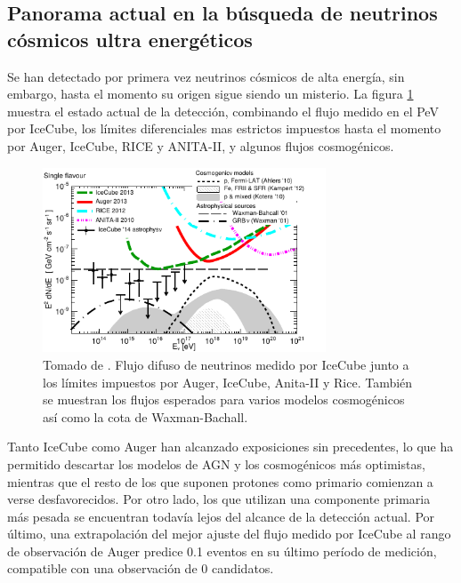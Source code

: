 	\subsection{Panorama actual en la b\'usqueda de neutrinos c\'osmicos ultra energ\'eticos}
	
	Se han detectado por primera vez neutrinos c\'osmicos de alta energ\'ia, sin embargo, hasta el momento su origen sigue siendo un misterio.
	La figura \ref{fig:multimess} muestra el estado actual de la detecci\'on, combinando el flujo medido en el PeV por IceCube, los l\'imites diferenciales mas estrictos impuestos hasta el momento por Auger, IceCube, RICE y ANITA-II, y algunos flujos cosmog\'enicos.
	\begin{figure}[ht]
		\begin{center}
		\includegraphics[width=0.75\textwidth]{fig/introduccion/1510-02050_multimessenger}
		\caption{\label{fig:multimess} Tomado de \cite{cite:multimess}. Flujo difuso de neutrinos medido por IceCube junto a los l\'imites impuestos por Auger, IceCube, Anita-II y Rice. Tambi\'en se muestran los flujos esperados para varios modelos cosmog\'enicos as\'i como la cota de Waxman-Bachall.}
		\end{center}
	\end{figure}
	
	Tanto IceCube como Auger han alcanzado exposiciones sin precedentes, lo que ha permitido descartar los modelos de AGN y los cosmog\'enicos m\'as optimistas, mientras que el resto de los que suponen protones como primario comienzan a verse desfavorecidos.
	Por otro lado, los que utilizan una componente primaria m\'as pesada se encuentran todav\'ia lejos del alcance de la detecci\'on actual.
	Por \'ultimo, una extrapolaci\'on del mejor ajuste del flujo medido por IceCube al rango de observaci\'on de Auger predice 0.1 eventos en su \'ultimo per\'iodo de medici\'on, compatible con una observaci\'on de 0 candidatos.
	
